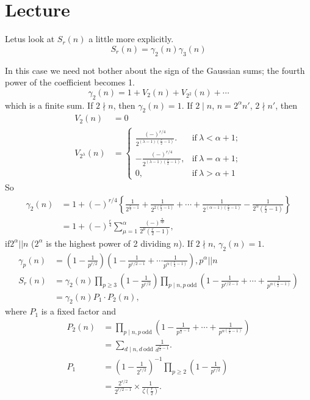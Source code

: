 \chapter{Lecture}\label{part4:lec40} %

Let\pageoriginale us look at $S_r(n)$ a little more explicitly.
$$
S_r (n) = \gamma_2 (n) \gamma_3 (n)
$$


In this case we need not bother about
the sign of the Gaussian sums; the fourth power of the coefficient
becomes 1.
$$
\gamma_2 (n) = 1+ V_2 (n) + V_{2^2} (n)+ \cdots
$$ 
which is a finite sum. If $2 \nmid n$, then $\gamma_2 (n) =1$. If
$2\mid n$, $n=2^\alpha n'$, $2 \nmid n'$, then 
\begin{align*}
  V_2 (n) & = 0\\
  V_{2^\lambda} (n) & = 
  \begin{cases}
    \frac{(-)^{r/4}}{2^{(\lambda-1)\left(\frac{r}{2}-1\right)}}. &
    \text{if}~ \lambda < \alpha +1;\\
    - \frac{(-)^{r/4}}{2^{(\lambda -1)\left(\frac{r}{2}-1 \right)}}, &
    \text{if}~ \lambda = \alpha +1;\\
    0, & \text{if}~ \lambda > \alpha + 1 
  \end{cases}
\end{align*}
So
\begin{align*}
  \gamma_2 (n) & = 1+ (-)^{r/4} \left\{ \frac{1}{2^{\frac{r}{2}-1}} +
  \frac{1}{2^{2\left(\frac{r}{2}-1 \right)}} + \cdots +
  \frac{1}{2^{(\alpha-1)\left(\frac{r}{2}-1 \right)}} -
  \frac{1}{2^\alpha \left(\frac{r}{2}-1 \right)}\right\}\\
  & = 1+ (-)^{\frac{r}{4}} \sum^{\alpha}_{\mu=1}
  \frac{(-)^{\frac{n}{2 \mu}}}{2^\mu \left( \frac{r}{2} -1\right)},
\end{align*}
if\pageoriginale $2^\alpha||n$ ($2^\alpha$ is the highest power of 2 dividing
$n$). If $2 \nmid n$, $\gamma_2 (n)=1$.
\begin{align*}
  \gamma_p (n) & = \left(1- \frac{1}{p^{r/2}} \right) \left(1-
  \frac{1}{p^{r/2-1}} + \cdots \frac{1}{p^{\alpha \left(\frac{r}{2}-1
      \right)}}\right), p^\alpha ||n\\
  S_r(n) & = \gamma_2 (n) \prod_{p \geq 3} \left(1- \frac{1}{p^{r/2}}
  \right) \prod_{p\mid n, p ~\text{odd}} \left(1- \frac{1}{p^{r/2-1}}+
  \cdots + \frac{1}{p^{\alpha\left( \frac{r}{2}-1\right)}} \right)\\
  & = \gamma_2 (n) P_1\cdot P_2(n),
\end{align*}
where $P_1$ is a fixed factor and 
\begin{align*}
  P_2 (n) & = \prod_{p\mid n, p ~\text{odd}} \left(1-
  \frac{1}{p^{\frac{r}{2}-1}}+ \cdots + \frac{1}{p^{\alpha
      \left(\frac{r}{2}-1 \right)}} \right)\\
  & = \sum_{d\mid n, d ~\text{odd}} \frac{1}{d^{\frac{r}{2}-1}}.\\
  P_1 & = \left(1- \frac{1}{2^{r/2}} \right)^{-1} \prod_{p \geq 2}
  \left(1- \frac{1}{p^{r/2}} \right) \\
  & = \frac{2^{r/2}}{2^{r/2-1}} \times \frac{1}{\zeta \left(\frac{r}{2}
    \right)}. 
\end{align*}

